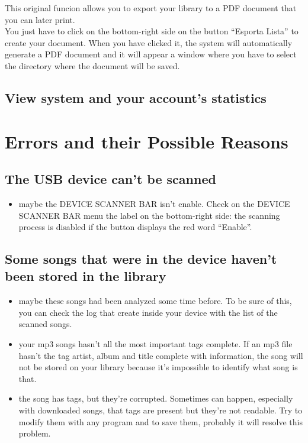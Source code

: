 This original funcion allows you to export your library to a PDF document that
you can later print.\\
You just have to click on the bottom-right side on the button ``Esporta Lista''
to create your document. When you have clicked it, the system will automatically
generate a PDF document and it will appear a window where you have to select the
directory where the document will be saved.

\subsection*{View system and your account's statistics}


\newpage
\section{Errors and their Possible Reasons}

\subsection*{The USB device can't be scanned}
\begin{itemize}
  \item maybe the DEVICE SCANNER BAR isn't enable. Check on the DEVICE SCANNER
  BAR menu the label on the bottom-right side: the scanning process is disabled
  if the button displays the red word ``Enable''.
\end{itemize}

\subsection*{Some songs that were in the device haven't been stored in the
library}
\begin{itemize}
  \item maybe these songs had been analyzed some time before. To be sure of
  this, you can check the log that  create inside your device with
  the list of the scanned songs.
  \item your mp3 songs hasn't all the most important tags complete. If an mp3
  file hasn't the tag artist, album and title complete with information, the
  song will not be stored on your library because it's impossible to identify
  what song is that.
  \item the song has tags, but they're corrupted. Sometimes can happen, especially
  with downloaded songs, that tags are present but they're not readable. Try to 
  modify them with any program and to save them, probably it will resolve this problem.
\end{itemize}

